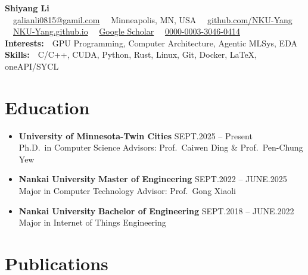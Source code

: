 \documentclass[a4paper,10pt]{article}
\newcommand{\faEnvelope}{}
\def\faMapMarker*{}
\newcommand{\faGithub}{}
\newcommand{\faGlobe}{}
\newcommand{\faGraduationCap}{}
\newcommand{\faOrcid}{}
\newcommand{\faChevronRight}{\textbullet}
\newcommand{\faUniversity}{}
\newcommand{\faBook}{}
\begin{document}
{\LARGE\bfseries\color{darktext} Shiyang Li}\vspace{4pt}\\
{\small
  \faEnvelope\ \ \href{mailto:galianli0815@gamil.com}{galianli0815@gamil.com} \quad
  \faMapMarker*\ \ Minneapolis, MN, USA \quad
  \faGithub\ \ \href{https://github.com/NKU-Yang}{github.com/NKU-Yang}
}\\[2pt]
{\small
  \faGlobe\ \ \href{https://NKU-Yang.github.io}{NKU-Yang.github.io} \quad
  \faGraduationCap\ \ \href{https://scholar.google.com/citations?hl=en&tzom=-480&user=q7EKI8MAAAAJ}{Google Scholar} \quad
  \faOrcid\ \ \href{https://orcid.org/0000-0003-3046-0414}{0000-0003-3046-0414}
}\\[2pt]
{\small
  \textbf{Interests:}\ \ GPU Programming, Computer Architecture, Agentic MLSys, EDA\\
  \textbf{Skills:}\ \ C/C++, CUDA, Python, Rust, Linux, Git, Docker, LaTeX, oneAPI/SYCL
}

\section{\texorpdfstring{\faUniversity\hspace{6pt}}{}Education}

\begin{itemize}[leftmargin=1.2em, label=\textcolor{sectioncolor}{\small\faChevronRight}, itemsep=4pt]

  \item \textbf{University of Minnesota-Twin Cities} \hfill SEPT.2025 -- Present\\
  Ph.D.\ in Computer Science \hfill Advisors: Prof.\ Caiwen Ding \& Prof.\ Pen-Chung Yew

  \item \textbf{Nankai University} \quad \textbf{Master of Engineering} \hfill SEPT.2022 -- JUNE.2025\\
  Major in Computer Technology \hfill Advisor: Prof.\ Gong Xiaoli

  \item \textbf{Nankai University} \quad \textbf{Bachelor of Engineering} \hfill SEPT.2018 -- JUNE.2022\\
  Major in Internet of Things Engineering

\end{itemize}

\section{\texorpdfstring{\faBook\hspace{6pt}}{}Publications}
\end{document}
